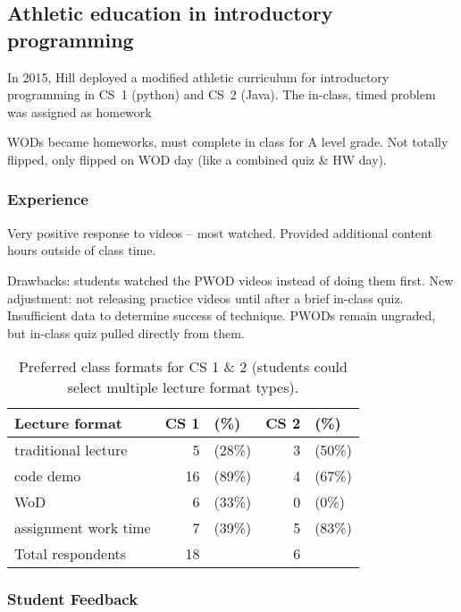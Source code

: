 \subsection{Athletic education in introductory programming}


In 2015, Hill deployed a modified athletic curriculum for introductory programming in CS~1 (python) and CS~2 (Java). The in-class, timed problem was assigned as homework

 WODs became homeworks, must complete in class for A level grade. Not totally flipped, only flipped on WOD day (like a combined quiz \& HW day).

\subsubsection{Experience}

Very positive response to videos -- most watched. Provided additional content hours outside of class time.

Drawbacks: students watched the PWOD videos instead of doing them first. New adjustment: not releasing practice videos until after a brief in-class quiz. Insufficient data to determine success of technique. PWODs remain ungraded, but in-class quiz pulled directly from them.

\begin{table}

\begin{center}
\begin{tabular}{lrlrl}
Lecture format & CS 1 & (\%) & CS 2 & (\%) \\
\hline
traditional lecture & 5 & (28\%)  & 3 & (50\%)\\
code demo & 16 & (89\%)  & 4 & (67\%)  \\
WoD &  6 & (33\%) & 0 & (0\%) \\
assignment work time & 7  & (39\%) & 5 & (83\%) \\
\hline
Total respondents &  18 &  & 6 &  \\

\end{tabular}
\end{center}
\caption{Preferred class formats for CS 1 \& 2 (students could select multiple lecture format types).}
\label{tab:format}
\end{table}

\subsubsection{Student Feedback}

